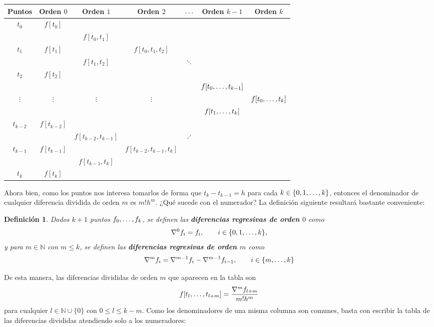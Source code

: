 \documentclass[11pt]{report}
\theoremstyle{mytheorem}
\theoremstyle{mydefinition}
\newtheorem{definition}{Definición}
\theoremstyle{myexample}
\newenvironment{cdefinition} %
  {\begin{mdframed}[
        linewidth=3pt,
        linecolor=c1,
        bottomline=false,
        topline=false,
        rightline=false,
        innerrightmargin=0pt,
        innertopmargin=0pt,
        innerbottommargin=0pt,
        innerleftmargin=1em, %
        skipabove=\baselineskip]
    \begin{definition}}
  {\end{definition}\end{mdframed}}
\newcommand{\N}{\mathbb N}
\newcommand{\mybf}[1]{\boldmath\textbf{\color{c1}#1}\unboldmath}
\begin{document}
\begin{center}
\begin{tabular}{|c|c|c|c|c|c|c|}
    \hline
    Puntos & Orden $0$ & Orden $1$ & Orden $2$ & $\mathellipsis$ & Orden $k-1$ & Orden $k$ \\ \hline
    $t_0$ & $f[t_0]$ & & & & & \\
    & & $f[t_0,t_1]$ & & & & \\
    $t_1$ & $f[t_1]$ & & $f[t_0,t_1,t_2]$ & & & \\
    & & $f[t_1,t_2]$ & &  $\ddots$ & & \\
    $t_2$ & $f[t_2]$ & & & & & \\
    & & & & & $f[t_0,\mathellipsis,t_{k-1}]$ & \\
    $\vdots$ & $\vdots$ & $\vdots$ & $\vdots$ & & & $f[t_0,\mathellipsis,t_k]$ \\
    & & & & & $f[t_1,\mathellipsis,t_k]$ & \\
    $t_{k-2}$ & $f[t_{k-2}]$ & & & & & \\
    & & $f[t_{k-2},t_{k-1}]$ & & $\iddots$ &  &\\
    $t_{k-1}$ & $f[t_{k-1}]$ & & $f[t_{k-2},t_{k-1},t_k]$ & & & \\
    & & $f[t_{k-1},t_k]$ & & & & \\
    $t_k$ & $f[t_k]$ & & & & & \\ \hline
\end{tabular}
\end{center}

\vspace{0.5\baselineskip}

Ahora bien, como los puntos nos interesa tomarlos de forma que $t_k-t_{k-1} = h$ para cada $k \in \{0,1,\mathellipsis,k\}$, entonces el denominador de cualquier diferencia dividida de orden $m$ es $m!h^m$. ¿Qué sucede con el numerador? La definición siguiente resultará bastante conveniente:

\begin{cdefinition}
Dados $k+1$ puntos $f_0,\mathellipsis,f_k$, se definen las \mybf{diferencias regresivas de orden $0$} como
\[\nabla^0f_i = f_i, \qquad i \in \{0,1,\mathellipsis,k\},\]
y para $m \in \N$ con $m \leq k$, se definen las \mybf{diferencias regresivas de orden $m$} como
\[\nabla^mf_i = \nabla^{m-1}f_i-\nabla^{m-1}f_{i-1}, \qquad i \in \{m,\mathellipsis,k\}\]
\end{cdefinition}

De esta manera, las diferencias divididas de orden $m$ que aparecen en la tabla son
\[f[t_l,\mathellipsis,t_{l+m}] = \frac{\nabla^mf_{l+m}}{m!h^m}\]
para cualquier $l \in \N \cup \{0\}$ con $0\leq l \leq k-m$. Como los denominadores de una misma columna son comunes, basta con escribir la tabla de las diferencias divididas atendiendo solo a los numeradores:
\end{document}
